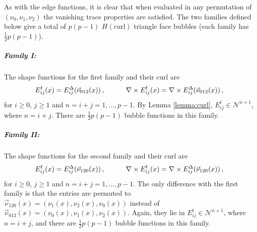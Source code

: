 As with the edge functions, it is clear that when evaluated in any permutation of $(\nu_0,\nu_1,\nu_2)$ the vanishing trace properties are satisfied.
The two families defined below give a total of $p(p-1)$ $H(\mathrm{curl})$ triangle face bubbles (each family has $\frac{1}{2}p(p-1)$).

\subparagraph{Family I:} 
The shape functions for the first family and their curl are
\begin{equation}
	E_{ij}^{\mathrm{f}}(x)=E_{ij}^\Delta(\vec{\nu}_{012}(x))\,,\qquad\quad
		\nabla\times E_{ij}^{\mathrm{f}}(x)=\nabla\times E_{ij}^\Delta(\vec{\nu}_{012}(x))\,,
\end{equation}
for $i\geq0$, $j\geq1$ and $n=i+j=1,\ldots,p-1$. 
By Lemma \ref{lemma:curl}, $E_{ij}^\mathrm{f}\in\mathcal{N}^{n+1}$, where $n=i+j$. 
There are $\frac{1}{2}p(p-1)$ bubble functions in this family.

\subparagraph{Family II:}
The shape functions for the second family and their curl are
\begin{equation}
	E_{ij}^{\mathrm{f}}(x)=E_{ij}^\Delta(\vec{\nu}_{120}(x))\,,\qquad\quad
		\nabla\times E_{ij}^{\mathrm{f}}(x)=\nabla\times E_{ij}^\Delta(\vec{\nu}_{120}(x))\,,
\end{equation}
for $i\geq0$, $j\geq1$ and $n=i+j=1,\ldots,p-1$.
The only difference with the first family is that the entries are permuted to $\vec{\nu}_{120}(x)=(\nu_1(x),\nu_2(x),\nu_0(x))$ instead of $\vec{\nu}_{012}(x)=(\nu_0(x),\nu_1(x),\nu_2(x))$.
Again, they lie in $E_{ij}^\mathrm{f}\in\mathcal{N}^{n+1}$, where $n=i+j$, and there are $\frac{1}{2}p(p-1)$ bubble functions in this family.

